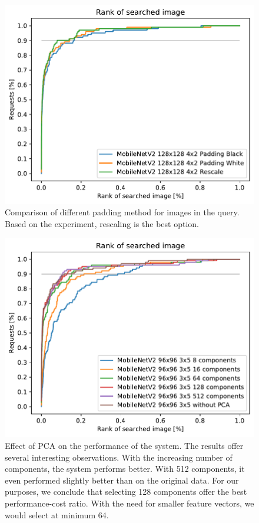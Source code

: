 \begin{figure}
    \centering
    \includegraphics[width=0.8\linewidth]{graphs/bf57efafbbbc7b5a1744054d87d4ecfa381c9eaf2459186904190d97bcb99a81.pdf}
    \caption{Comparison of different padding method for images in the query. Based on the experiment, rescaling is the best option.}
    \label{fig:padding}
\end{figure}

\begin{figure}
    \centering
    \includegraphics[width=0.8\linewidth]{graphs/6fbd4f70810e1f63f400ef601c1cdba0fd1635749810aa2347a4ff26e6fccf47.pdf}
    \caption{Effect of PCA on the performance of the system. The results offer several interesting observations. With the increasing number of components, the system performs better. With 512 components, it even performed slightly better than on the original data. For our purposes, we conclude that selecting 128 components offer the best performance-cost ratio. With the need for smaller feature vectors, we would select at minimum 64.}
    \label{fig:pca}
\end{figure}

